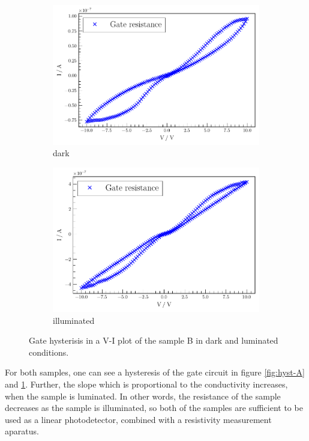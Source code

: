 \begin{figure}
    \centering
\begin{subfigure}{.4\textwidth}
    \centering
    \includegraphics[width=\textwidth]{plots/B_dark.pdf}
    \caption{dark}
\end{subfigure}
\begin{subfigure}{.4\textwidth}
    \centering
    \includegraphics[width=\textwidth]{plots/B_light.pdf}
    \caption{illuminated}
\end{subfigure}
\caption{Gate hysterisis in a V-I plot of the sample B in dark and luminated conditions.}\label{fig:hyst-B}
\end{figure}

For both samples, one can see a hysteresis of the gate circuit in figure \ref{fig:hyst-A} and \ref{fig:hyst-B}.
Further, the slope which is proportional to the conductivity increases, when the sample is luminated. 
In other words, the resistance of the sample decreases as the sample is illuminated, so both of the samples are sufficient to be used as a linear photodetector, combined with a resistivity measurement aparatus.
 
